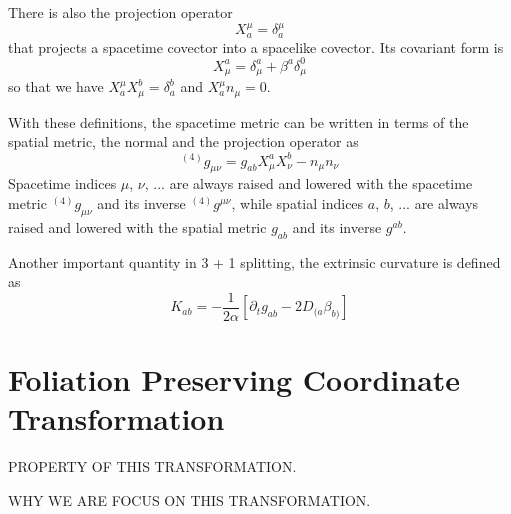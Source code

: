 \documentclass[letterpaper,nofootinbib,prd,amsmath,onecolumn]{revtex4-1}
\begin{document}
There is also the projection operator
\begin{equation}\label{projection 1}
X^{\mu}_{a} = \delta^{\mu}_{a}
\end{equation}
that projects a spacetime covector into a spacelike covector. Its covariant form is
\begin{equation}\label{projection 2}
X^{a}_{\mu} = \delta^{a}_{\mu} + \beta^{a}\delta^{0}_{\mu}
\end{equation}
so that we have $X^{\mu}_{a}X^{b}_{\mu} = \delta^{b}_{a}$ and $X^{\mu}_{a}n_{\mu} = 0$. 

With these definitions, the spacetime metric can be written in terms of the spatial metric, the normal and the projection operator as
\begin{equation}\label{spacetime metric 3 + 1}
^{(4)}g_{\mu\nu} = g_{ab}X^{a}_{\mu}X^{b}_{\nu} - n_{\mu}n_{\nu}
\end{equation}
Spacetime indices $\mu$, $\nu$, ... are always raised and lowered with the spacetime metric $^{(4)}g_{\mu\nu}$ and its inverse $^{(4)}g^{\mu\nu}$, while spatial indices $a$, $b$, ... are always raised and lowered with the spatial metric $g_{ab}$ and its inverse $g^{ab}$. 

Another important quantity in 3 + 1 splitting, the extrinsic curvature is defined as
\begin{equation}\label{extrinsic}
K_{ab} = - \frac{1}{2\alpha}\left[\partial_{t}g_{ab} - 2D_{(a}\beta_{b)}\right]
\end{equation}
\section{Foliation Preserving Coordinate Transformation}\label{transform}
{\bf {\color{red}PROPERTY OF THIS TRANSFORMATION.

WHY WE ARE FOCUS ON THIS TRANSFORMATION.}} 
\end{document}
